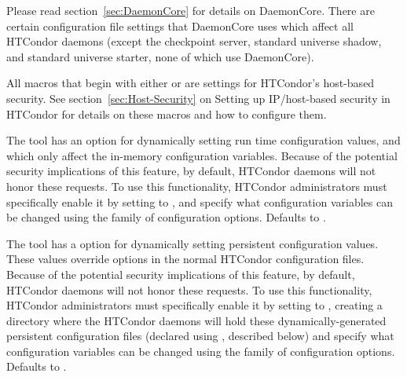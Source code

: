 Please read section~\ref{sec:DaemonCore} for details
on DaemonCore.  There are certain configuration file settings that
DaemonCore uses which affect all HTCondor daemons (except the checkpoint
server, standard universe shadow, and standard universe starter, none of
which use DaemonCore).
\begin{description}

\label{param:HostAllow}
\item[\Macro{HOSTALLOW\Dots}]
  All macros that begin with either  or
   are settings for HTCondor's host-based security.
  See section~\ref{sec:Host-Security} on Setting up
  IP/host-based security in HTCondor for details on these
  macros and how to configure them.

\label{param:EnableRuntimeConfig}
\item[\Macro{ENABLE\_RUNTIME\_CONFIG}]
  The  tool has an option  for
  dynamically setting run time configuration values, and which only affect
  the in-memory configuration variables.
  Because of the potential security implications of this feature, by
  default, HTCondor daemons will not honor these requests.
  To use this functionality, HTCondor administrators must specifically
  enable it by setting  to , and
  specify what configuration variables can be changed using the
   family of configuration options.
  Defaults to .

\label{param:EnablePersistentConfig}
\item[\Macro{ENABLE\_PERSISTENT\_CONFIG}]
  The  tool has a  option for
  dynamically setting persistent configuration values.
  These values override options in the normal HTCondor configuration
  files.
  Because of the potential security implications of this feature, by
  default, HTCondor daemons will not honor these requests.
  To use this functionality, HTCondor administrators must specifically
  enable it by setting  to ,
  creating a directory where the HTCondor daemons will hold these
  dynamically-generated persistent configuration files (declared using
  , described below) and specify what
  configuration variables can be changed using the
   family of configuration options.
  Defaults to .


\end{description}
